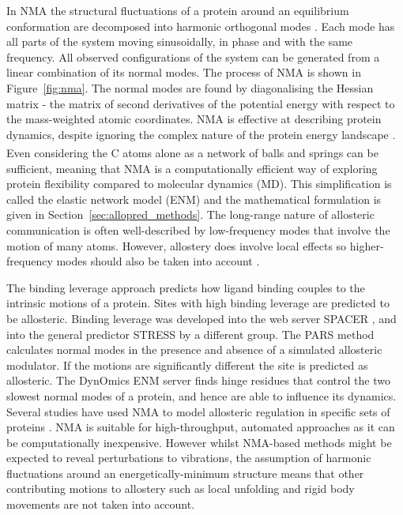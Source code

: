 In NMA the structural fluctuations of a protein around an equilibrium conformation are decomposed into harmonic orthogonal modes \cite{Hayward2008}.
Each mode has all parts of the system moving sinusoidally, in phase and with the same frequency.
All observed configurations of the system can be generated from a linear combination of its normal modes.
The process of NMA is shown in Figure~\ref{fig:nma}.
The normal modes are found by diagonalising the Hessian matrix - the matrix of second derivatives of the potential energy with respect to the mass-weighted atomic coordinates.
NMA is effective at describing protein dynamics, despite ignoring the complex nature of the protein energy landscape \cite{Bahar2005}.
Even considering the C\textsuperscript{\textalpha} atoms alone as a network of balls and springs can be sufficient, meaning that NMA is a computationally efficient way of exploring protein flexibility compared to molecular dynamics (MD).
This simplification is called the elastic network model (ENM) and the mathematical formulation is given in Section~\ref{sec:allopred_methods}.
The long-range nature of allosteric communication is often well-described by low-frequency modes that involve the motion of many atoms.
However, allostery does involve local effects so higher-frequency modes should also be taken into account \cite{Collier2013}.

The binding leverage approach \cite{Mitternacht2011} predicts how ligand binding couples to the intrinsic motions of a protein.
Sites with high binding leverage are predicted to be allosteric.
Binding leverage was developed into the web server SPACER \cite{Goncearenco2013}, and into the general predictor STRESS \cite{Clarke2016} by a different group.
The PARS method \cite{Panjkovich2012, Panjkovich2014} calculates normal modes in the presence and absence of a simulated allosteric modulator.
If the motions are significantly different the site is predicted as allosteric.
The DynOmics ENM server \cite{Li2017} finds hinge residues that control the two slowest normal modes of a protein, and hence are able to influence its dynamics.
Several studies have used NMA to model allosteric regulation in specific sets of proteins \cite{Balabin2009, Rodgers2013, Zheng2007, Su2014}.
NMA is suitable for high-throughput, automated approaches as it can be computationally inexpensive.
However whilst NMA-based methods might be expected to reveal perturbations to vibrations, the assumption of harmonic fluctuations around an energetically-minimum structure means that other contributing motions to allostery such as local unfolding and rigid body movements \cite{Motlagh2014} are not taken into account.


